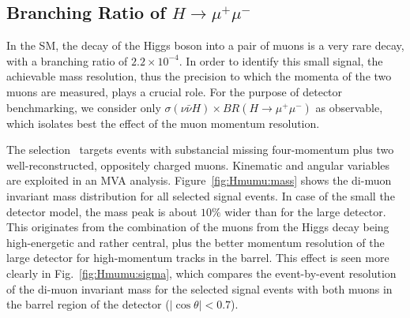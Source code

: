 \subsection{Branching Ratio of \texorpdfstring{$H \to \mu^+\mu^-$}{H -> mm}}

In the SM, the decay of the Higgs boson into a pair of muons is a very rare decay, with a branching ratio of $2.2 \times 10^{-4}$. In order to identify this small signal, the achievable mass resolution, thus the precision to which the momenta of the two muons are measured, plays a crucial role. For the purpose of detector benchmarking, we consider only 
$\sigma(\nu\bar{\nu} H)\times BR(H\to \mu^+\mu^-)$ as observable, which isolates best the effect of the muon momentum resolution.

The selection~\cite{ILDNote:Hmumu} targets events with substancial missing four-momentum plus 
two well-reconstructed, oppositely charged muons. Kinematic and angular variables are exploited in an MVA analysis. Figure~\ref{fig:Hmumu:mass} shows the di-muon invariant mass distribution for all selected signal events. In case of the small the detector model, the mass peak is about $10\%$ wider than for the large detector. This originates from the combination of the muons from the Higgs decay being high-energetic and rather central, plus the better momentum resolution of the large detector for high-momentum tracks in the barrel. 
This effect is seen more clearly in Fig.~\ref{fig:Hmumu:sigma}, which compares the event-by-event resolution of the di-muon invariant mass for the selected signal events with both muons in the barrel region of the detector ($|\cos{\theta}| < 0.7$). 


